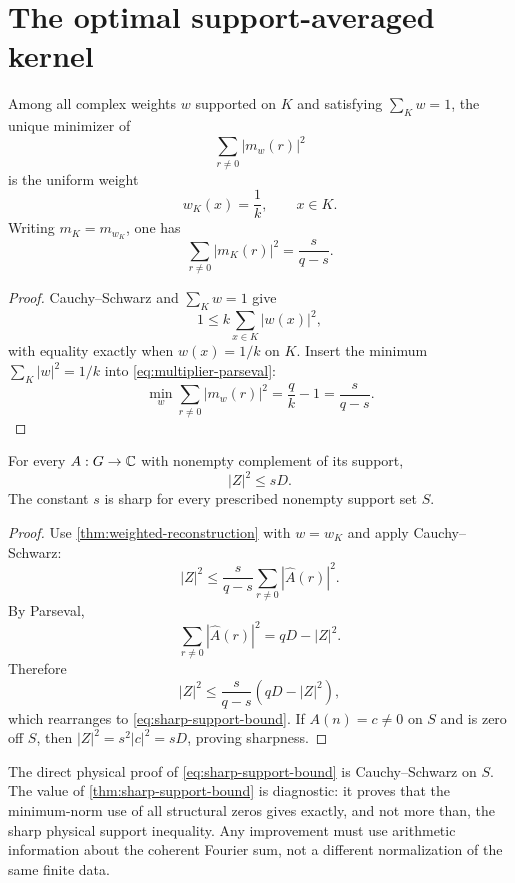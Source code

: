 \section{The optimal support-averaged kernel}
\label{sec:optimal-kernel}

\begin{theorem}
\label{thm:optimal-kernel}
Among all complex weights \(w\) supported on \(K\) and satisfying
\(\sum_Kw=1\), the unique minimizer of
\[
 \sum_{r\ne0}|m_w(r)|^2
\]
is the uniform weight
\[
 w_K(x)=\frac1k,\qquad x\in K.
\]
Writing \(m_K=m_{w_K}\), one has
\begin{equation}
 \boxed{
 \sum_{r\ne0}|m_K(r)|^2
 =\frac{s}{q-s}.}
\label{eq:optimal-norm}
\end{equation}
\end{theorem}

\begin{proof}
Cauchy--Schwarz and \(\sum_Kw=1\) give
\[
 1\le k\sum_{x\in K}|w(x)|^2,
\]
with equality exactly when \(w(x)=1/k\) on \(K\).  Insert the minimum
\(\sum_K|w|^2=1/k\) into
\eqref{eq:multiplier-parseval}:
\[
 \min_w\sum_{r\ne0}|m_w(r)|^2
 =\frac qk-1=\frac{s}{q-s}.
\]
\end{proof}

\begin{theorem}
\label{thm:sharp-support-bound}
For every \(A:G\to\mathbb C\) with nonempty complement of its support,
\begin{equation}
 \boxed{|Z|^2\le sD.}
\label{eq:sharp-support-bound}
\end{equation}
The constant \(s\) is sharp for every prescribed nonempty support
set \(S\).
\end{theorem}

\begin{proof}
Use \cref{thm:weighted-reconstruction} with \(w=w_K\) and apply
Cauchy--Schwarz:
\[
 |Z|^2
 \le
 \frac{s}{q-s}
 \sum_{r\ne0}|\widehat A(r)|^2.
\]
By Parseval,
\[
 \sum_{r\ne0}|\widehat A(r)|^2=qD-|Z|^2.
\]
Therefore
\[
 |Z|^2\le\frac{s}{q-s}(qD-|Z|^2),
\]
which rearranges to \eqref{eq:sharp-support-bound}.  If
\(A(n)=c\ne0\) on \(S\) and is zero off \(S\), then
\(|Z|^2=s^2|c|^2=sD\), proving sharpness.
\end{proof}

\begin{remark}
The direct physical proof of \eqref{eq:sharp-support-bound} is
Cauchy--Schwarz on \(S\).  The value of
\cref{thm:sharp-support-bound} is diagnostic: it proves that the
minimum-norm use of all structural zeros gives exactly, and not more
than, the sharp physical support inequality.  Any improvement must
use arithmetic information about the coherent Fourier sum, not a
different normalization of the same finite data.
\end{remark}

